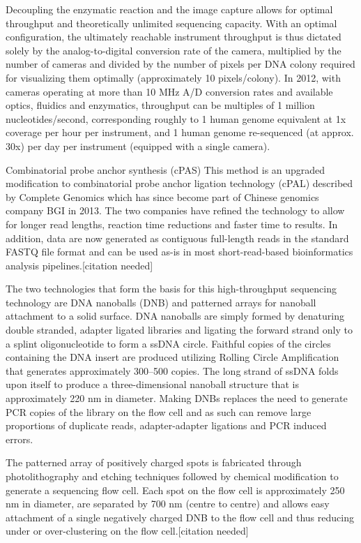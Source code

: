 Decoupling the enzymatic reaction and the image capture allows for optimal throughput and theoretically unlimited sequencing capacity. With an optimal configuration, the ultimately reachable instrument throughput is thus dictated solely by the analog-to-digital conversion rate of the camera, multiplied by the number of cameras and divided by the number of pixels per DNA colony required for visualizing them optimally (approximately 10 pixels/colony). In 2012, with cameras operating at more than 10 MHz A/D conversion rates and available optics, fluidics and enzymatics, throughput can be multiples of 1 million nucleotides/second, corresponding roughly to 1 human genome equivalent at 1x coverage per hour per instrument, and 1 human genome re-sequenced (at approx. 30x) per day per instrument (equipped with a single camera).

Combinatorial probe anchor synthesis (cPAS)
This method is an upgraded modification to combinatorial probe anchor ligation technology (cPAL) described by Complete Genomics which has since become part of Chinese genomics company BGI in 2013. The two companies have refined the technology to allow for longer read lengths, reaction time reductions and faster time to results. In addition, data are now generated as contiguous full-length reads in the standard FASTQ file format and can be used as-is in most short-read-based bioinformatics analysis pipelines.{[}citation needed{]}

The two technologies that form the basis for this high-throughput sequencing technology are DNA nanoballs (DNB) and patterned arrays for nanoball attachment to a solid surface. DNA nanoballs are simply formed by denaturing double stranded, adapter ligated libraries and ligating the forward strand only to a splint oligonucleotide to form a ssDNA circle. Faithful copies of the circles containing the DNA insert are produced utilizing Rolling Circle Amplification that generates approximately 300--500 copies. The long strand of ssDNA folds upon itself to produce a three-dimensional nanoball structure that is approximately 220 nm in diameter. Making DNBs replaces the need to generate PCR copies of the library on the flow cell and as such can remove large proportions of duplicate reads, adapter-adapter ligations and PCR induced errors.

The patterned array of positively charged spots is fabricated through photolithography and etching techniques followed by chemical modification to generate a sequencing flow cell. Each spot on the flow cell is approximately 250 nm in diameter, are separated by 700 nm (centre to centre) and allows easy attachment of a single negatively charged DNB to the flow cell and thus reducing under or over-clustering on the flow cell.{[}citation needed{]}

